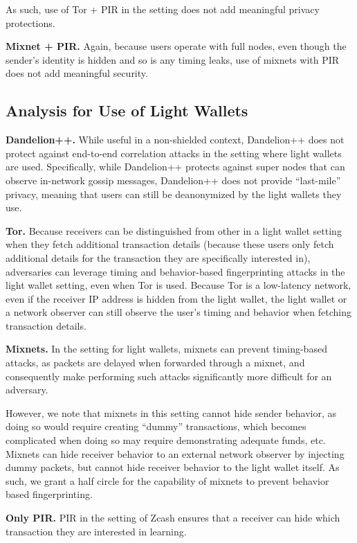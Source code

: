 \documentclass{article}
\begin{document}
As such, use of Tor + PIR in the setting does not add meaningful privacy
protections.

\textbf{Mixnet + PIR.}
Again, because users operate with full nodes, even though the sender's identity
is hidden and so is any timing leaks, use of mixnets with PIR does not add
meaningful security.

\subsection{Analysis for Use of Light Wallets}

\textbf{Dandelion++.}
While useful in a non-shielded context, Dandelion++ does not protect against
end-to-end correlation attacks in the setting where light wallets are used.
Specifically, while Dandelion++ protects against super nodes that can observe
in-network gossip messages, Dandelion++ does not provide ``last-mile'' privacy,
meaning that users can still be deanonymized by the light wallets they use.

\textbf{Tor.}
Because receivers can be distinguished from other in a light wallet setting
when they fetch additional transaction details (because these users only fetch
additional details for the transaction they are specifically interested in),
adversaries can leverage timing and behavior-based fingerprinting attacks in
the light wallet setting, even when Tor is used. Because Tor is a low-latency
network, even if the receiver IP address is hidden from the light wallet, the
light wallet or a network observer can still observe the user's timing and
behavior when fetching transaction details.

\textbf{Mixnets.}
In the setting for light wallets, mixnets can prevent timing-based attacks, as
packets are delayed when forwarded through a mixnet, and consequently make
performing such attacks significantly more difficult for an adversary.

However, we note that mixnets in this setting cannot hide sender behavior, as
doing so would require creating ``dummy'' transactions, which becomes
complicated when doing so may require demonstrating adequate funds, etc.
Mixnets can hide receiver behavior to an external network observer by injecting
dummy packets, but cannot hide receiver behavior to the light wallet itself. As
such, we grant a half circle for the capability of mixnets to prevent behavior
based fingerprinting.

\textbf{Only PIR.}
PIR in the setting of Zcash ensures that a receiver can hide which transaction
they are interested in learning.
\end{document}
